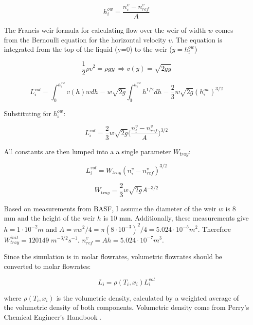 \begin{equation}
    h^{ow}_i = \frac{n^v_i-n^v_{ref}}{A}
\end{equation}


The Francis weir formula for calculating flow over the weir of width $w$ comes from the Bernoulli equation for the horizontal velocity $v$. The equation is integrated from the top of the liquid (y=0) to the weir ($y=h_i^{ow}$)

\begin{equation}
    \frac{1}{2} \rho v^2 = \rho g y \ \Longrightarrow v(y) = \sqrt{2gy}
\end{equation}

\begin{equation}
    L_i^{vol} = \int_0^{h_i^{ow}} v(h)wdh = w\sqrt{2g}\int_0^{h_i^{ow}} h^{1/2}dh = \frac{2}{3}w\sqrt{2g}(h_i^{ow})^{3/2} 
\end{equation}


Substituting for $h_i^{ow}$:

\begin{equation}
   L_i^{vol} = \frac{2}{3} w\sqrt{2g}\biggl(\frac{n^v_i-n^v_{ref}}{A}\biggr)^{3/2}  
\end{equation}

All constants are then lumped into a a single parameter $W_{tray}$:

\begin{equation}
    L_i^{vol} = W_{tray}(n_i^v-n^v_{ref})^{3/2}
\end{equation}

\begin{equation}
    W_{tray} = \frac{2}{3}w\sqrt{2g}A^{-3/2}
\end{equation}

Based on measurements from BASF, I assume the diameter of the weir $w$ is 8 mm and the height of the weir $h$ is 10 mm. Additionally, these measurements give $h = 1\cdot10^{-2} m$ and $A=\pi w^2/4 = \pi(8 \cdot 10^{-3})^2/4 = 5.024 \cdot 10^{-5} m^2$. Therefore $W_{tray}^{init}=120149 \; m^{-3/2}s^{-1}$. $n^v_{ref}=Ah=5.024 \cdot 10^{-7} m^3$. 

Since the simulation is in molar flowrates, volumetric flowrates should be converted to molar flowrates:

\begin{equation}
    L_i = \rho(T_i, x_i)L^{vol}_i  
\end{equation}


where $\rho(T_i,x_i)$ is the volumetric density, calculated by a weighted average of the volumetric density of both components. Volumetric density come from Perry’s Chemical Engineer's Handbook \cite{Perrys2018}.


